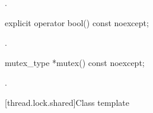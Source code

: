 \begin{itemdescr}
\pnum
\returns
{}.
\end{itemdescr}

%
\begin{itemdecl}
explicit operator bool() const noexcept;
\end{itemdecl}

\begin{itemdescr}
\pnum
\returns
{}.
\end{itemdescr}

%
\begin{itemdecl}
mutex_type *mutex() const noexcept;
\end{itemdecl}

\begin{itemdescr}
\pnum
\returns
{}.
\end{itemdescr}

[thread.lock.shared]{Class template }

